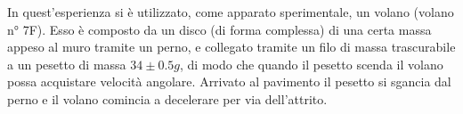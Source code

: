 In quest'esperienza si è utilizzato, come apparato sperimentale, un volano (volano n° 7F). Esso è composto da un disco (di forma complessa) di una certa massa appeso al muro tramite un perno, e collegato tramite un filo di massa trascurabile a un pesetto di massa $34 \pm 0.5 g$, di modo che quando il pesetto scenda il volano possa acquistare velocità angolare. Arrivato al pavimento il pesetto si sgancia dal perno e il volano comincia a decelerare per via dell'attrito.

